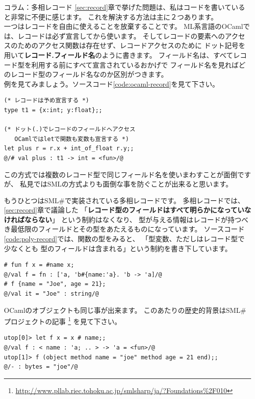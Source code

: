 \documentclass[11pt,a4paper]{jarticle}
\begin{document}
\begin{itembox}[l]{コラム：多相レコード}
  \ref{sec:record}章で挙げた問題は、私はコードを書いていると非常に不便に感じます。
  これを解決する方法は主に２つあります。\\
  一つはレコードを自由に使えることを放棄することです。
  ML系言語のOCaml\cite{ocaml}では、レコードは必ず宣言してから使います。
  そしてレコードの要素へのアクセスのためのアクセス関数は存在せず、レコードアクセスのために
  ドット記号を用いて\textbf{レコード.フィールド名}のように書きます。
  フィールド名は、すべてレコード型を利用する前にすべて宣言されているおかげで
  フィールド名を見ればどのレコード型のフィールド名なのか区別がつきます。\\
  例を見てみましょう。ソースコード\ref{code:ocaml-record}を見て下さい。

\begin{lstlisting}[caption=OCamlにおけるレコード,label=code:ocaml-record]
(* レコードは予め宣言する *)
type t1 = {x:int; y:float};;

(* ドット(.)でレコードのフィールドへアクセス
   OCamlではletで関数も変数も宣言する *)
let plus r = r.x + int_of_float r.y;;
@/# val plus : t1 -> int = <fun>/@
\end{lstlisting}

  この方式では複数のレコード型で同じフィールド名を使いまわすことが面倒ですが、
  私見ではSMLの方式よりも面倒な事を防ぐことが出来ると思います。

  もうひとつはSML\#\cite{smlsharp}で実装されている多相レコードです。
  多相レコードでは、\ref{sec:record}章で議論した
 「\textbf{レコード型のフィールドはすべて明らかになっていなければならない}」
  という制約はなくなり、
  型が与える情報はレコードが持つべき最低限のフィールドとその型をあたえるものになっています。
  ソースコード\ref{code:poly-record}では、関数の型をみると、
  「型変数、ただしはレコード型で少なくとも
  型のフィールドは含まれる」という制約を書き下しています。

\begin{lstlisting}[caption=SML\#の多相レコード,label=code:poly-record]
# fun f x = #name x;
@/val f = fn : ['a, 'b#{name:'a}. 'b -> 'a]/@
# f {name = "Joe", age = 21};
@/val it = "Joe" : string/@
\end{lstlisting}

  OCamlのオブジェクトも同じ事が出来ます。
  このあたりの歴史的背景はSML\#プロジェクトの記事  \footnote{\url{http://www.pllab.riec.tohoku.ac.jp/smlsharp/ja/?Foundations\%2F010}}
  を見て下さい。

\begin{lstlisting}[caption=OCamlのオブジェクト,label=code:ocaml-obj]
utop[0]> let f x = x # name;;
@/val f : < name : 'a; .. > -> 'a = <fun>/@
utop[1]> f (object method name = "joe" method age = 21 end);;
@/- : bytes = "joe"/@
\end{lstlisting}

\end{itembox}
\end{document}
